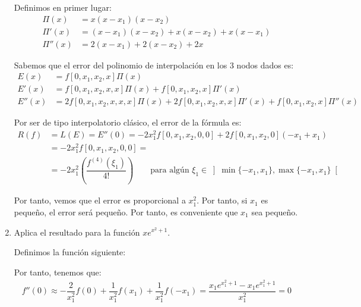 \begin{ejercicio}
\begin{enumerate}
        Definimos en primer lugar:
        \begin{align*}
            \Pi(x) &= x(x-x_1)(x-x_2)\\
            \Pi'(x) &= (x-x_1)(x-x_2) + x(x-x_2) + x(x-x_1)\\
            \Pi''(x) &= 2(x-x_1) + 2(x-x_2) + 2x
        \end{align*}

        Sabemos que el error del polinomio de interpolación en los $3$ nodos dados es:
        \begin{align*}
            E(x) &= f[0, x_1, x_2, x]\Pi(x)\\
            E'(x) &= f[0, x_1, x_2, x, x]\Pi(x) + f[0, x_1, x_2, x]\Pi'(x)\\
            E''(x) &= 2f[0, x_1, x_2, x, x, x]\Pi(x) + 2f[0, x_1, x_2, x, x]\Pi'(x) + f[0, x_1, x_2, x]\Pi''(x)
        \end{align*}

        Por ser de tipo interpolatorio clásico, el error de la fórmula es:
        \begin{align*}
            R(f) &= L(E) = E''(0) = -2x_1^2f[0, x_1, x_2, 0, 0]+2f[0, x_1, x_2, 0]\left(-x_1+x_1\right)\\
            &= -2x_1^2f[0, x_1, x_2, 0, 0]=\\&= -2x_1^2\left(\dfrac{f^{(4)}(\xi_1)}{4!}\right)\qquad \text{para algún }\xi_1\in\left]\min\{-x_1,x_1\},\max\{-x_1,x_1\}\right[
        \end{align*}

    
        Por tanto, vemos que el error es proporcional a $x_1^2$. Por tanto, si $x_1$ es pequeño, el error será pequeño. Por tanto, es conveniente que $x_1$ sea pequeño.
        
        \item Aplica el resultado para la función $x e^{x^2 + 1}$.
        
        Definimos la función siguiente:

        Por tanto, tenemos que:
        \begin{align*}
            f''(0)\approx -\dfrac{2}{x_1^2}f(0) + \dfrac{1}{x_1^2}f(x_1) + \dfrac{1}{x_1^2}f(-x_1)
            = \dfrac{x_1e^{x_1^2+1}-x_1e^{x_1^2+1}}{x_1^2}=0
        \end{align*}
        
    \end{enumerate}
\end{ejercicio}

